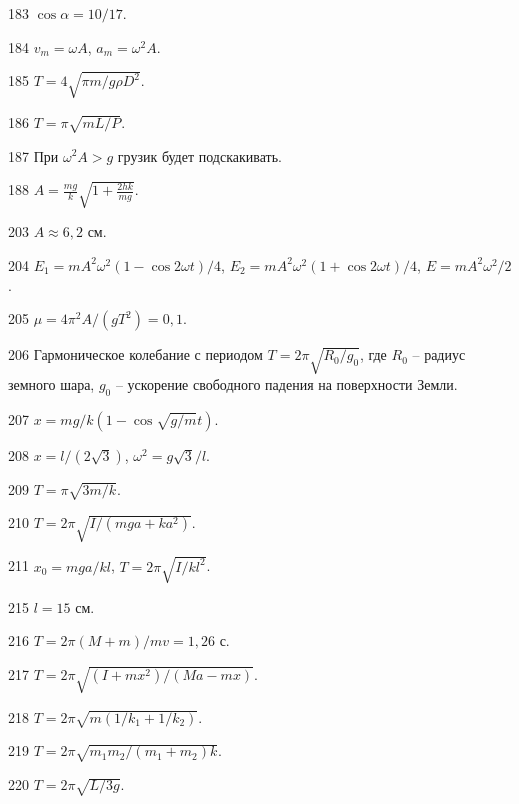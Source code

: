 \begin{Answer}{183}
$\cos \alpha = 10/17$.
\end{Answer}
\begin{Answer}{184}
$v_m = \omega A$, $a_m = \omega^2 A$.
\end{Answer}
\begin{Answer}{185}
$T = 4 \sqrt{\pi m / g \rho D^2}$.
\end{Answer}
\begin{Answer}{186}
$T = \pi \sqrt{m L /P}$.
\end{Answer}
\begin{Answer}{187}
При $\omega^2 A > g$ грузик будет подскакивать.
\end{Answer}
\begin{Answer}{188}
$A = \frac{mg}{k}\sqrt{ 1 + \frac{2hk}{mg}}$.
\end{Answer}
\begin{Answer}{203}
$A \approx 6,2$ см.
\end{Answer}
\begin{Answer}{204}
$E_1 = m A^2 \omega^2 (1 - \cos 2 \omega t)/4$, $E_2 = m A^2 \omega^2 (1 + \cos 2 \omega t)/4$, $E = m A^2 \omega^2 /2$.
\end{Answer}
\begin{Answer}{205}
$\mu = 4 \pi^2 A / (gT^2) = 0,1$.
\end{Answer}
\begin{Answer}{206}
Гармоническое колебание с периодом $T = 2 \pi \sqrt{R_0 / g_0}$, где $R_0$ -- радиус земного шара, $g_0$ -- ускорение свободного падения на поверхности Земли.
\end{Answer}
\begin{Answer}{207}
$x = mg/k(1-\cos \sqrt{g/m} t)$.
\end{Answer}
\begin{Answer}{208}
$x = l/(2\sqrt{3})$, $\omega^2 = g\sqrt{3} / l$.
\end{Answer}
\begin{Answer}{209}
$T =  \pi\sqrt{3m/k}$.
\end{Answer}
\begin{Answer}{210}
$T = 2 \pi \sqrt{I/(mga + ka^2)}$.
\end{Answer}
\begin{Answer}{211}
$x_0 = mga/kl$, $T = 2 \pi \sqrt{I/kl^2}$.
\end{Answer}
\begin{Answer}{215}
$l = 15$ см.
\end{Answer}
\begin{Answer}{216}
$T = 2 \pi (M+m) / mv = 1,26$ с.
\end{Answer}
\begin{Answer}{217}
$T = 2 \pi \sqrt{(I+mx^2)/(Ma - mx)}$.
\end{Answer}
\begin{Answer}{218}
$T = 2 \pi \sqrt{m(1/k_1 + 1/k_2)}$.
\end{Answer}
\begin{Answer}{219}
$T = 2 \pi \sqrt{m_1m_2/(m_1 + m_2)k}$.
\end{Answer}
\begin{Answer}{220}
$T = 2 \pi \sqrt{L/3g}$.
\end{Answer}
